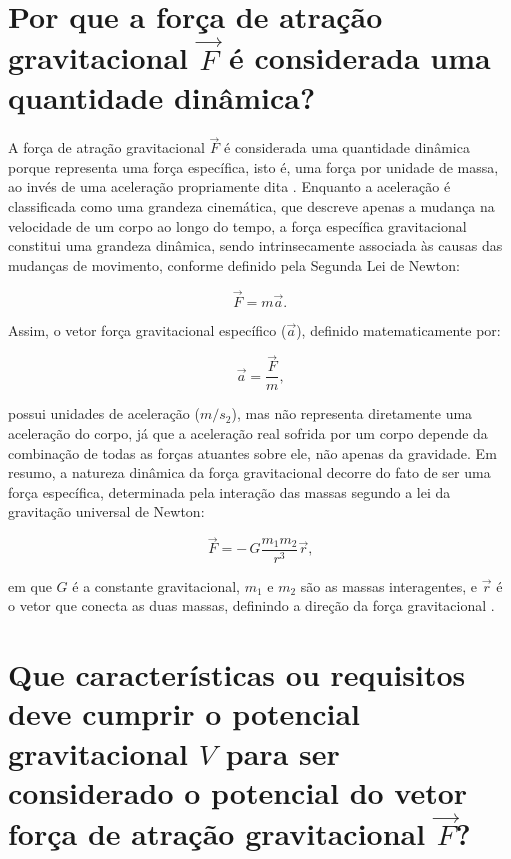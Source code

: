 \section{Por que a força de atração gravitacional $\vec{F}$ é considerada uma quantidade dinâmica?}


A força de atração gravitacional \(\vec{F}\) é considerada uma quantidade dinâmica porque representa uma força específica, isto é, uma força por unidade de massa, ao invés de uma aceleração propriamente dita \citep{sneeuw2006physical}. Enquanto a aceleração é classificada como uma grandeza cinemática, que descreve apenas a mudança na velocidade de um corpo ao longo do tempo, a força específica gravitacional constitui uma grandeza dinâmica, sendo intrinsecamente associada às causas das mudanças de movimento, conforme definido pela Segunda Lei de Newton:

\begin{equation*}
  \label{eq_dinamica}
  \vec{F} = m \vec{a} \text{.}  
\end{equation*}

\noindent
Assim, o vetor força gravitacional específico (\(\vec{a}\)), definido matematicamente por:

\begin{equation*}
  \label{eq_específico}
  \vec{a} = \frac{\vec{F}}{m} \text{,}  
\end{equation*}

\noindent
possui unidades de aceleração (\(m/s_2\)), mas não representa diretamente uma aceleração do corpo, já que a aceleração real sofrida por um corpo depende da combinação de todas as forças atuantes sobre ele, não apenas da gravidade. Em resumo, a natureza dinâmica da força gravitacional decorre do fato de ser uma força específica, determinada pela interação das massas segundo a lei da gravitação universal de Newton:


\begin{equation*}
  \label{eq_gravitação}
  \vec{F} = -\,G \frac{m_1 m_2}{r^3} \vec{r} \text{,}  
\end{equation*}

\noindent
em que \(G\) é a constante gravitacional, \(m_1\) e \(m_2\) são as massas interagentes, e \(\vec{r}\) é o vetor que conecta as duas massas, definindo a direção da força gravitacional \citep{sneeuw2006physical}.


\section{Que características ou requisitos deve cumprir o potencial gravitacional $V$ para ser considerado o potencial do vetor força de atração gravitacional $\vec{F}$?}


